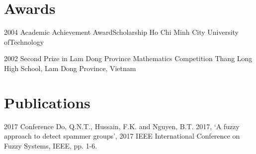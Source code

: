 \documentclass{tccv}
\begin{document}
\section{Awards}

\begin{yearlist}

\item{2004}
    {Academic Achievement Award\newline Scholarship}
    {Ho Chi Minh City University of\newline Technology}

\item{2002}
    {Second Prize in Lam Dong Province Mathematics Competition}
    {Thang Long High School, Lam Dong Province, Vietnam}

\end{yearlist}

\section{Publications}

\begin{yearlist}
\item{2017}
    {Conference}
    {Do, Q.N.T., Hussain, F.K. and Nguyen, B.T. 2017, ‘A fuzzy approach to
        detect spammer groups’, 2017 IEEE International Conference on Fuzzy
    Systems, IEEE, pp. 1-6.}
\end{yearlist}
\end{document}
